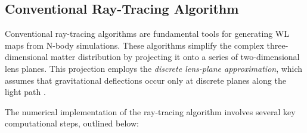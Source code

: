 \subsection{Conventional Ray-Tracing Algorithm}
\label{subsec:conventional-ray-tracing}
Conventional ray-tracing algorithms are fundamental tools for generating WL maps from N-body simulations. These algorithms simplify the complex three-dimensional matter distribution by projecting it onto a series of two-dimensional lens planes. This projection employs the \textit{discrete lens-plane approximation}, which assumes that gravitational deflections occur only at discrete planes along the light path \citep{2000ApJ...530..547J, 2009A&A...499...31H}. 

The numerical implementation of the ray-tracing algorithm involves several key computational steps, outlined below:

